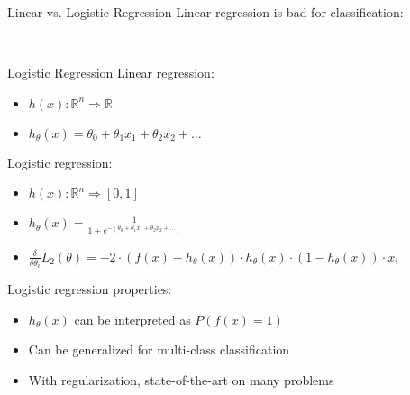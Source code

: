 \documentclass[14pt]{beamer}
\begin{document}
\begin{frame}[label=logistic-regression-intro]{Linear vs. Logistic Regression}
\centering
Linear regression is bad for classification:\\
\bigskip
{}\\
\end{frame}

\begin{frame}[label=logistic-regression]{Logistic Regression}
Linear regression:
\begin{itemize}
\item $h(x): \mathbb{R}^n \Rightarrow \mathbb{R}$
\item $h_{\theta}(x) = \theta_0 + \theta_1 x_1 + \theta_2 x_2 + \ldots$
\end{itemize}
\pause
Logistic regression:
\begin{itemize}
\item $h(x): \mathbb{R}^n \Rightarrow [0,1]$
\item $\displaystyle h_{\theta}(x) = \frac{1}{1 + e^{-(\theta_0 + \theta_1 x_1 + \theta_2 x_2 + \ldots)}}$
\pause
\item $\displaystyle \frac{\delta}{\delta \theta_i} L_2(\theta) = -2 \cdot ( f(x) - h_{\theta}(x) ) \cdot h_{\theta}(x) \cdot ( 1 - h_{\theta}(x) ) \cdot x_i $
\end{itemize}
\medskip
\pause
Logistic regression properties:
\begin{itemize}
\item $h_{\theta}(x)$ can be interpreted as $P(f(x) = 1)$
\item Can be generalized for multi-class classification
\item With regularization, state-of-the-art on many problems
\end{itemize}
\end{frame}
\end{document}
